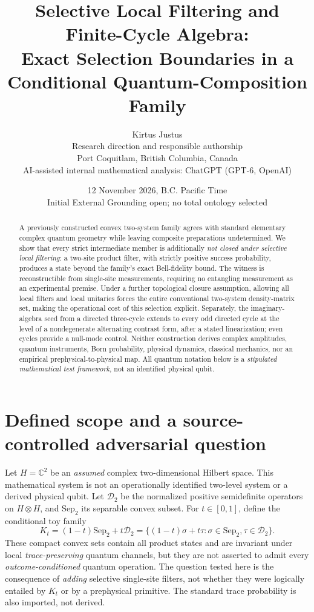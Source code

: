 \documentclass[10pt,letterpaper]{article}
\title{\bfseries Selective Local Filtering and Finite-Cycle Algebra:\\[2pt]
\large Exact Selection Boundaries in a Conditional Quantum-Composition Family}
\author{Kirtus Justus\\\small Research direction and responsible authorship\\
\small Port Coquitlam, British Columbia, Canada\\[3pt]
\small AI-assisted internal mathematical analysis: ChatGPT (GPT-6, OpenAI)}
\date{12 November 2026, B.C. Pacific Time\\\small Initial External Grounding open; no total ontology selected}
\newcommand{\D}{\mathcal D}
\newcommand{\Sep}{\mathrm{Sep}}
\newcommand{\C}{\mathbb C}
\begin{document}
\maketitle
\begin{abstract}
A previously constructed convex two-system family agrees with standard elementary complex quantum geometry while leaving composite preparations undetermined. We show that every strict intermediate member is additionally \emph{not closed under selective local filtering}: a two-site product filter, with strictly positive success probability, produces a state beyond the family's exact Bell-fidelity bound. The witness is reconstructible from single-site measurements, requiring no entangling measurement as an experimental premise. Under a further topological closure assumption, allowing all local filters and local unitaries forces the entire conventional two-system density-matrix set, making the operational cost of this selection explicit. Separately, the imaginary-algebra seed from a directed three-cycle extends to every odd directed cycle at the level of a nondegenerate alternating contrast form, after a stated linearization; even cycles provide a null-mode control. Neither construction derives complex amplitudes, quantum instruments, Born probability, physical dynamics, classical mechanics, nor an empirical prephysical-to-physical map. All quantum notation below is a \emph{stipulated mathematical test framework}, not an identified physical qubit.
\end{abstract}

\section{Defined scope and a source-controlled adversarial question}
Let $H=\C^2$ be an \emph{assumed} complex two-dimensional Hilbert space. This mathematical system is not an operationally identified two-level system or a derived physical qubit. Let $\D_2$ be the normalized positive semidefinite operators on $H\otimes H$, and $\Sep_2$ its separable convex subset. For $t\in[0,1]$, define the conditional toy family
\begin{equation}\label{eq:Kt}
K_t=(1-t)\Sep_2+t\D_2=\{(1-t)\sigma+t\tau:\sigma\in\Sep_2,\tau\in\D_2\}.
\end{equation}
These compact convex sets contain all product states and are invariant under local \emph{trace-preserving} quantum channels, but they are not asserted to admit every \emph{outcome-conditioned} quantum operation. The question tested here is the consequence of \emph{adding} selective single-site filters, not whether they were logically entailed by $K_t$ or by a prephysical primitive. The standard trace probability is also imported, not derived.
\end{document}
